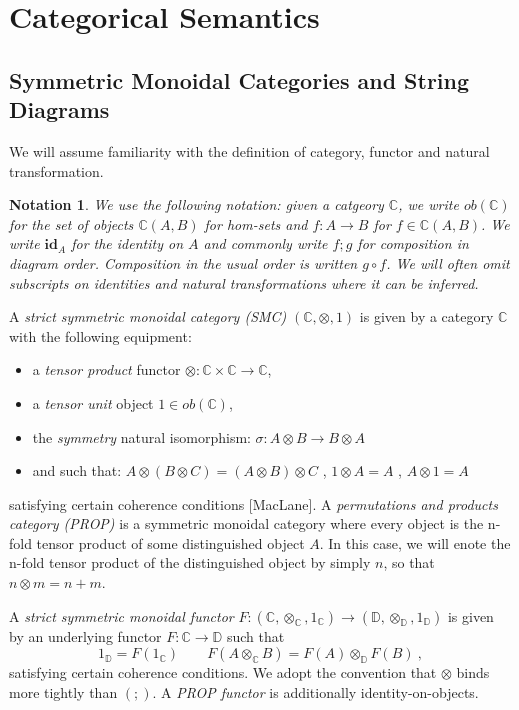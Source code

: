 
\newtheorem*{notation*}{Notation}

\section{Categorical Semantics}

\subsection{Symmetric Monoidal Categories and String Diagrams}

We will assume familiarity with the definition of category,  functor and natural transformation.
\begin{notation*}
We use the following notation: given a catgeory $\mathbb{C}$, we write $ob(\mathbb{C})$ for the set of objects $\mathbb{C}(A,B)$ for hom-sets and $f: A \to B$ for $f \in \mathbb{C}(A,B)$. We write $\textbf{id}_A$ for the identity on $A$ and commonly write $f;g$ for composition in diagram order.  Composition in the usual order is written $g \circ f$. 
We will often omit subscripts on identities and natural transformations where it can be inferred. 
\end{notation*}
\begin{definition}
A \textit{strict symmetric monoidal category (SMC)} $(\mathbb{C}, \otimes, 1)$ is given by a category $\mathbb{C}$ with the following equipment: 
\begin{itemize}
\item a \textit{tensor product} functor $\otimes: \mathbb{C} \times \mathbb{C} \to \mathbb{C}$,
\item a \textit{tensor unit} object $1 \in ob(\mathbb{C})$, 
\item the \textit{symmetry} natural isomorphism: $\sigma: A \otimes B \to B \otimes A$
\item and such that: $A \otimes (B \otimes C) = (A \otimes B) \otimes C$ ,  $1 \otimes A = A$ ,  $A \otimes 1 = A$
\end{itemize}
satisfying certain coherence conditions [MacLane].  A \textit{permutations and products category (PROP)} is a symmetric monoidal category where every object is the n-fold tensor product of some distinguished object $A$. In this case, we will enote the n-fold tensor product of the distinguished object by simply $n$, so that $n \otimes m = n+m$.

A \textit{strict symmetric monoidal functor} $F: (\mathbb{C}, \otimes_\mathbb{C}, 1_\mathbb{C}) \to (\mathbb{D}, \otimes_\mathbb{D}, 1_\mathbb{D})$ is given by an underlying functor $F: \mathbb{C} \to \mathbb{D}$ such that 
\[
 1_{\mathbb{D}} = F(1_{\mathbb{C}})
 \qquad F(A \otimes_{\mathbb{C}} B) = F(A) \otimes_{\mathbb{D}} F(B)\ ,
\]
satisfying certain coherence conditions. 
We adopt the convention that $\otimes$ binds more tightly than $(;\!)$. 
A \textit{PROP functor} is additionally identity-on-objects. 
\end{definition}

